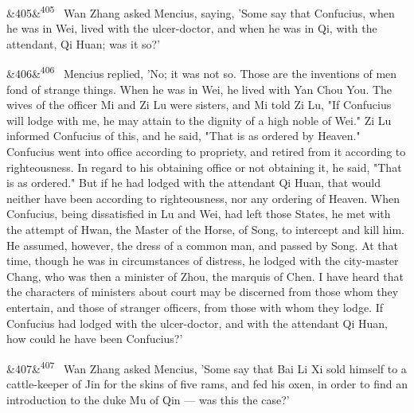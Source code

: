 \documentclass[12pt]{article}
\newcommand{\para}[1][]{\par\noindent\ifx&#1&\else\textsuperscript{\footnotesize #1}~\fi}
\begin{document}
\para[405] Wan Zhang asked Mencius, saying, 'Some say that Confucius, when he was in Wei, lived with the ulcer-doctor, and when he was in Qi, with the attendant, Qi Huan; was it so?'

\para[406] Mencius replied, 'No; it was not so. Those are the inventions of men fond of strange things. When he was in Wei, he lived with Yan Chou You. The wives of the officer Mi and Zi Lu were sisters, and Mi told Zi Lu, "If Confucius will lodge with me, he may attain to the dignity of a high noble of Wei." Zi Lu informed Confucius of this, and he said, "That is as ordered by Heaven." Confucius went into office according to propriety, and retired from it according to righteousness. In regard to his obtaining office or not obtaining it, he said, "That is as ordered." But if he had lodged with the attendant Qi Huan, that would neither have been according to righteousness, nor any ordering of Heaven. When Confucius, being dissatisfied in Lu and Wei, had left those States, he met with the attempt of Hwan, the Master of the Horse, of Song, to intercept and kill him. He assumed, however, the dress of a common man, and passed by Song. At that time, though he was in circumstances of distress, he lodged with the city-master Chang, who was then a minister of Zhou, the marquis of Chen. I have heard that the characters of ministers about court may be discerned from those whom they entertain, and those of stranger officers, from those with whom they lodge. If Confucius had lodged with the ulcer-doctor, and with the attendant Qi Huan, how could he have been Confucius?'

\para[407] Wan Zhang asked Mencius, 'Some say that Bai Li Xi sold himself to a cattle-keeper of Jin for the skins of five rams, and fed his oxen, in order to find an introduction to the duke Mu of Qin --- was this the case?'
\end{document}
